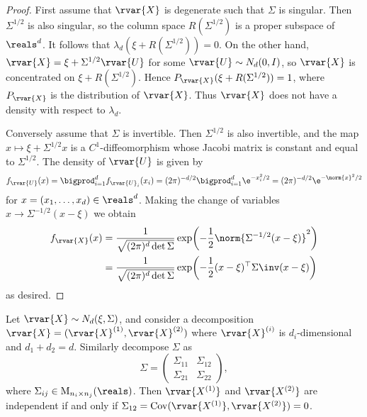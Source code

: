 \documentclass[article, a4paper, 11pt, oneside]{memoir}
\numberwithin{equation}{chapter}
\begin{document}
\begin{proof}
    First assume that $\rvar{X}$ is degenerate such that $\Sigma$ is singular. Then $\Sigma^{1/2}$ is also singular, so the column space $R(\Sigma^{1/2})$ is a proper subspace of $\reals^d$. It follows that $\lambda_d(\xi + R(\Sigma^{1/2})) = 0$. On the other hand, $\rvar{X} = \xi + \Sigma^{1/2} \rvar{U}$ for some $\rvar{U} \sim N_d(0,I)$, so $\rvar{X}$ is concentrated on $\xi + R(\Sigma^{1/2})$. Hence $P_{\rvar{X}}(\xi + R(\Sigma^{1/2})) = 1$, where $P_{\rvar{X}}$ is the distribution of $\rvar{X}$. Thus $\rvar{X}$ does not have a density with respect to $\lambda_d$.

    Conversely assume that $\Sigma$ is invertible. Then $\Sigma^{1/2}$ is also invertible, and the map $x \mapsto \xi + \Sigma^{1/2} x$ is a $C^1$-diffeomorphism whose Jacobi matrix is constant and equal to $\Sigma^{1/2}$. The density of $\rvar{U}$ is given by
    \begin{equation*}
        f_{\rvar{U}}(x)
            = \bigprod_{i=1}^d f_{\rvar{U}_i}(x_i)
            = (2\pi)^{-d/2} \bigprod_{i=1}^d \e^{-x_i^2/2}
            = (2\pi)^{-d/2} \e^{-\norm{x}^2/2}
    \end{equation*}
    for $x = (x_1, \ldots, x_d) \in \reals^d$. Making the change of variables $x \to \Sigma^{-1/2} (x - \xi)$ we obtain
    \begin{align*}
        f_{\rvar{X}}(x)
            &= \frac{1}{\sqrt{ (2\pi)^d \det\Sigma }} \exp\biggl( - \frac{1}{2} \norm{\Sigma^{-1/2}(x - \xi)}^2 \biggr) \\
            &= \frac{1}{\sqrt{ (2\pi)^d \det\Sigma }} \exp\biggl( - \frac{1}{2} (x - \xi)\trans\Sigma\inv(x - \xi) \biggr)
    \end{align*}
    as desired.
\end{proof}


\begin{proposition}
    Let $\rvar{X} \sim N_d(\xi,\Sigma)$, and consider a decomposition $\rvar{X} = (\rvar{X}^{(1)}, \rvar{X}^{(2)})$ where $\rvar{X}^{(i)}$ is $d_i$-dimensional and $d_1 + d_2 = d$. Similarly decompose $\Sigma$ as
    \begin{equation*}
        \Sigma =
            \begin{pmatrix}
                \Sigma_{11} & \Sigma_{12} \\
                \Sigma_{21} & \Sigma_{22}
            \end{pmatrix},
    \end{equation*}
    where $\Sigma_{ij} \in \mat_{n_i \times n_j}(\reals)$. Then $\rvar{X^{(1)}}$ and $\rvar{X^{(2)}}$ are independent if and only if $\Sigma_{12} = \cov(\rvar{X^{(1)}},\rvar{X^{(2)}}) = 0$.
\end{proposition}
\end{document}
